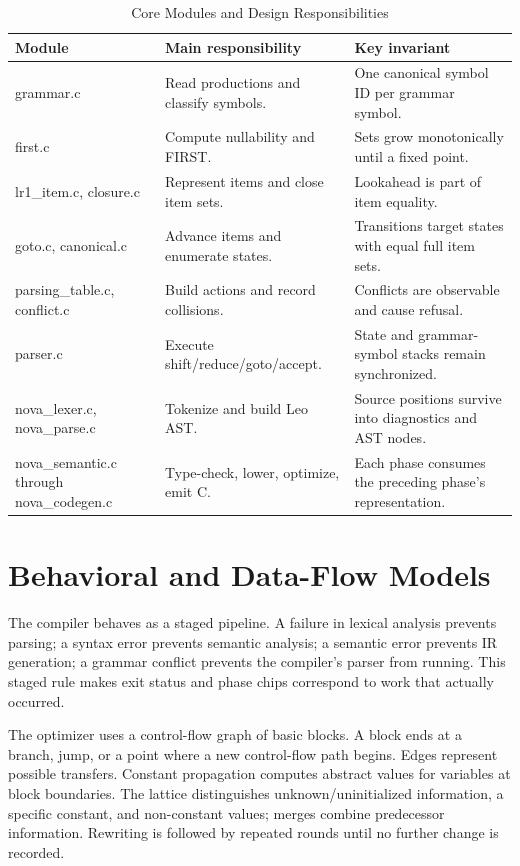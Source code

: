 \documentclass[12pt,a4paper,oneside]{report}
\begin{document}
\begin{table}[H]
\centering
\caption{Core Modules and Design Responsibilities}
\begin{tabularx}{\textwidth}{p{2.8cm}p{3.2cm}Y}
\toprule
\textbf{Module} & \textbf{Main responsibility} & \textbf{Key invariant}\\
\midrule
grammar.c & Read productions and classify symbols. & One canonical symbol ID per grammar symbol.\\
first.c & Compute nullability and FIRST. & Sets grow monotonically until a fixed point.\\
lr1\_item.c, closure.c & Represent items and close item sets. & Lookahead is part of item equality.\\
goto.c, canonical.c & Advance items and enumerate states. & Transitions target states with equal full item sets.\\
parsing\_table.c, conflict.c & Build actions and record collisions. & Conflicts are observable and cause refusal.\\
parser.c & Execute shift/reduce/goto/accept. & State and grammar-symbol stacks remain synchronized.\\
nova\_lexer.c, nova\_parse.c & Tokenize and build Leo AST. & Source positions survive into diagnostics and AST nodes.\\
nova\_semantic.c through nova\_codegen.c & Type-check, lower, optimize, emit C. & Each phase consumes the preceding phase's representation.\\
\bottomrule
\end{tabularx}
\end{table}

\section{Behavioral and Data-Flow Models}
The compiler behaves as a staged pipeline. A failure in lexical analysis prevents parsing; a syntax error prevents semantic analysis; a semantic error prevents IR generation; a grammar conflict prevents the compiler's parser from running. This staged rule makes exit status and phase chips correspond to work that actually occurred.

The optimizer uses a control-flow graph of basic blocks. A block ends at a branch, jump, or a point where a new control-flow path begins. Edges represent possible transfers. Constant propagation computes abstract values for variables at block boundaries. The lattice distinguishes unknown/uninitialized information, a specific constant, and non-constant values; merges combine predecessor information. Rewriting is followed by repeated rounds until no further change is recorded.
\end{document}
